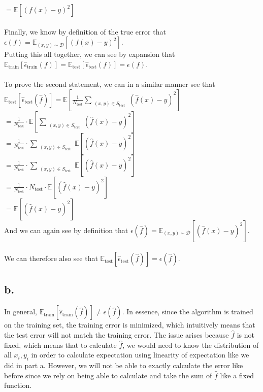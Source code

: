 \documentclass{article}
\newcommand{\1}{\mathbf{1}}
\newcommand{\E}{\mathbb{E}}
\begin{document}
{$= \E[(f(x) - y)^2]$ \\ \\
Finally, we know by definition of the true error that $\epsilon(f) = \E_{(x,y) \sim \mathcal{D}}[(f(x) - y)^2]$. \\ 
Putting this all together, we can see by expansion that $\E_{\text{train}}[\widehat{\epsilon}_{\text{train}}(f)] = \E_{\text{test}}[\widehat{\epsilon}_{\text{test}}(f)] = \epsilon(f)$. \\ \\
To prove the second statement, we can in a similar manner see that \\
$\E_{\text{test}}[\widehat{\epsilon}_{\text{test}}(\widehat{f})] = \E[\frac{1}{N_{\text{test}}} \sum\limits_{\substack{(x,y) \in S_{\text{test}}}} (\widehat{f}(x) - y)^2]$ \\
$= \frac{1}{N_{\text{test}}} \cdot \E[\sum\limits_{\substack{(x,y) \in S_{\text{test}}}} (\widehat{f}(x) - y)^2]$ \\
$= \frac{1}{N_{\text{test}}} \cdot \sum\limits_{\substack{(x,y) \in S_{\text{test}}}} \E[(\widehat{f}(x) - y)^2]$ \\
$= \frac{1}{N_{\text{test}}} \cdot \sum\limits_{\substack{(x,y) \in S_{\text{test}}}} \E[(\widehat{f}(x) - y)^2]$ \\
$= \frac{1}{N_{\text{test}}} \cdot N_{\text{test}} \cdot \E[(\widehat{f}(x) - y)^2]$ \\
$= \E[(\widehat{f}(x) - y)^2]$ \\
And we can again see by definition that $\epsilon(\widehat{f}) = \E_{(x,y) \sim \mathcal{D}}[(\widehat{f}(x) - y)^2]$. \\ \\
We can therefore also see that $\E_{\text{test}}[\widehat{\epsilon}_{\text{test}}(\widehat{f})] = \epsilon(\widehat{f})$.

\subsection*{b.}

In general, $\E_{\text{train}}[\widehat{\epsilon}_{\text{train}}(\widehat{f})] \neq \epsilon(\widehat{f})$. In essence, since the algorithm is trained on the training set, the training error is minimized, which intuitively means that the test error will not match the training error. The issue arises because $\widehat{f}$ is not fixed, which means that to calculate $\widehat{f}$, we would need to know the distribution of all $x_i, y_i$ in order to calculate expectation using linearity of expectation like we did in part a. However, we will not be able to exactly calculate the error like before since we rely on being able to calculate and take the sum of $\widehat{f}$ like a fixed function. 

}
\end{document}
